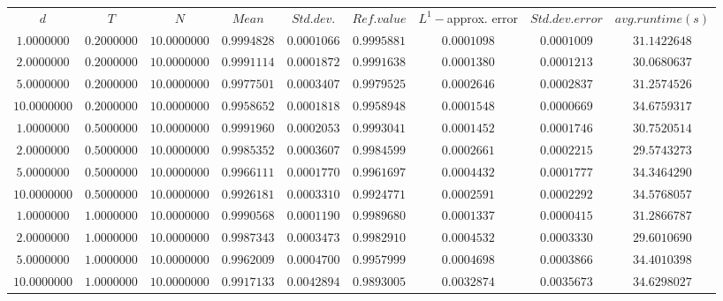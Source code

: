 \begin{tabular}{ccccccccc}
$d$ & $T$ & $N$ & $Mean$ & $Std. dev.$ & $Ref. value$ & $L^1-$approx. error & $Std. dev. error$ & $avg. runtime (s)$\\
$1.0000000$ & $0.2000000$ & $10.0000000$ & $0.9994828$ & $0.0001066$ & $0.9995881$ & $0.0001098$ & $0.0001009$ & $31.1422648$\\
$2.0000000$ & $0.2000000$ & $10.0000000$ & $0.9991114$ & $0.0001872$ & $0.9991638$ & $0.0001380$ & $0.0001213$ & $30.0680637$\\
$5.0000000$ & $0.2000000$ & $10.0000000$ & $0.9977501$ & $0.0003407$ & $0.9979525$ & $0.0002646$ & $0.0002837$ & $31.2574526$\\
$10.0000000$ & $0.2000000$ & $10.0000000$ & $0.9958652$ & $0.0001818$ & $0.9958948$ & $0.0001548$ & $0.0000669$ & $34.6759317$\\
$1.0000000$ & $0.5000000$ & $10.0000000$ & $0.9991960$ & $0.0002053$ & $0.9993041$ & $0.0001452$ & $0.0001746$ & $30.7520514$\\
$2.0000000$ & $0.5000000$ & $10.0000000$ & $0.9985352$ & $0.0003607$ & $0.9984599$ & $0.0002661$ & $0.0002215$ & $29.5743273$\\
$5.0000000$ & $0.5000000$ & $10.0000000$ & $0.9966111$ & $0.0001770$ & $0.9961697$ & $0.0004432$ & $0.0001777$ & $34.3464290$\\
$10.0000000$ & $0.5000000$ & $10.0000000$ & $0.9926181$ & $0.0003310$ & $0.9924771$ & $0.0002591$ & $0.0002292$ & $34.5768057$\\
$1.0000000$ & $1.0000000$ & $10.0000000$ & $0.9990568$ & $0.0001190$ & $0.9989680$ & $0.0001337$ & $0.0000415$ & $31.2866787$\\
$2.0000000$ & $1.0000000$ & $10.0000000$ & $0.9987343$ & $0.0003473$ & $0.9982910$ & $0.0004532$ & $0.0003330$ & $29.6010690$\\
$5.0000000$ & $1.0000000$ & $10.0000000$ & $0.9962009$ & $0.0004700$ & $0.9957999$ & $0.0004698$ & $0.0003866$ & $34.4010398$\\
$10.0000000$ & $1.0000000$ & $10.0000000$ & $0.9917133$ & $0.0042894$ & $0.9893005$ & $0.0032874$ & $0.0035673$ & $34.6298027$\\
\end{tabular}
